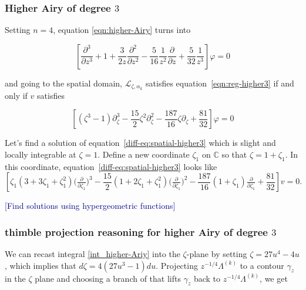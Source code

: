 \documentclass{article}
\theoremstyle{definition}
\newcommand{\C}{\mathbb{C}}
\newcommand{\laplace}{\mathcal{L}}
\begin{document}
\subsubsection{Higher Airy of degree $3$}
Setting $n=4$, equation \eqref{eqn:higher-Airy} turns into 

\begin{equation}\label{eqn:reg-higher3}
\left[\frac{\partial^3}{\partial z^3}+1+\frac{3}{2z}\frac{\partial^2}{\partial z^2}-\frac{5}{16}\frac{1}{z^2}\frac{\partial}{\partial z}+\frac{5}{32}\frac{1}{z^3}\right]\varphi=0
\end{equation}

and going to the spatial domain, $\laplace_{\zeta,\alpha_k}$ satisfies equation~\eqref{eqn:reg-higher3} if and only if $v$ satisfies 


\begin{equation}\label{diff-eq:spatial-higher3}
\left[(\zeta^3-1)\partial_\zeta^3-\frac{15}{2}\zeta^2\partial_\zeta^2-\frac{187}{16}\zeta\partial_\zeta+\frac{81}{32}\right]\varphi=0
\end{equation}

Let's find a solution of equation~\eqref{diff-eq:spatial-higher3} which is slight and locally integrable at $\zeta = 1$. Define a new coordinate $\zeta_1$ on $\C$ so that $\zeta = 1 + \zeta_1$. In this coordinate, equation~\eqref{diff-eq:spatial-higher3} looks like
\begin{equation}%
\left[\zeta_1(3 + 3\zeta_1 + \zeta_1^2) \big(\tfrac{\partial}{\partial \zeta_1}\big)^3 - \frac{15}{2}(1 + 2\zeta_1 + \zeta_1^2) \big(\tfrac{\partial}{\partial \zeta_1}\big)^2 -\frac{187}{16}(1+\zeta_1)\tfrac{\partial}{\partial \zeta_1} + \frac{81}{32}\right] v = 0.
\end{equation}

\textcolor{DarkBlue}{[Find solutions using hypergeometric functions]}

\subsubsection{thimble projection reasoning for higher Airy of degree $3$}

We can recast integral \eqref{int_higher-Ariy} into the $\zeta$-plane by setting $\zeta=27 u^4-4 u$, which implies that $d\zeta=4 (27 u^3-1) du$. Projecting $z^{-1/4}\Lambda^{(k)}$ to a contour $\gamma_z$ in the $\zeta$ plane and choosing a branch of that lifts $\gamma_z$ back to $z^{-1/4}\Lambda^{(k)}$, we get 
\end{document}
